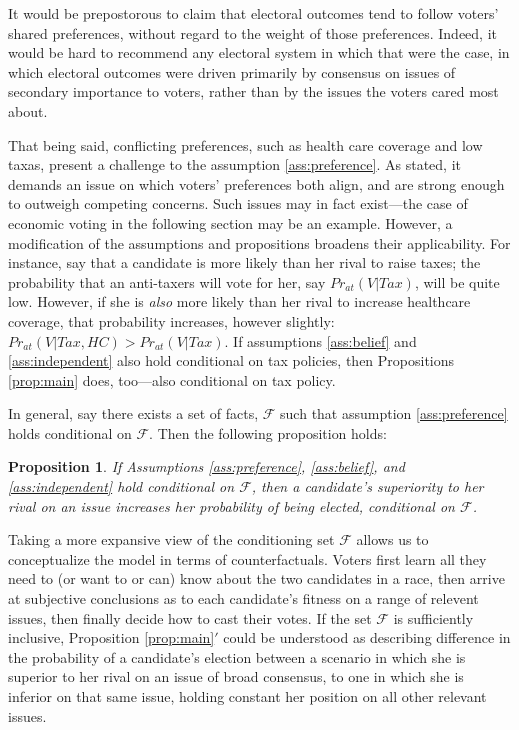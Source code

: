 \documentclass[11pt]{article}
\newtheorem{prop}{Proposition}
\newenvironment{propbis}[1]
  {\renewcommand{\theprop}{\ref{#1}$'$}%
   \addtocounter{prop}{-1}%
   \begin{prop}}
  {\end{prop}}
\begin{document}
It would be prepostorous to claim that electoral outcomes tend
to follow voters' shared preferences, without regard to the weight of
those preferences.
Indeed, it would be hard to recommend any electoral system in which
that were the case, in which electoral outcomes were driven primarily by
consensus on issues of secondary importance to voters, rather than by
the issues the voters cared most about. 

That being said, conflicting preferences, such as health care coverage
and low taxas, present a challenge to the assumption
\ref{ass:preference}.
As stated, it demands an issue on which voters' preferences both
align, and are strong enough to outweigh competing concerns.
Such issues may in fact exist---the case of economic voting in the
following section may be an example.
However, a modification of the assumptions and propositions
broadens their applicability. 
For instance, say that a candidate is more likely than her rival to
raise taxes; the probability that an anti-taxers will vote for her,
say $Pr_{at}(V|Tax)$, will be quite low.
However, if she is \emph{also} more likely than her rival to increase
healthcare coverage, that probability increases, however slightly:
$Pr_{at}(V|Tax,HC)>Pr_{at}(V|Tax)$. 
If assumptions \ref{ass:belief} and \ref{ass:independent} also hold
conditional on tax policies, then Propositions \ref{prop:main} does,
too---also conditional on tax policy.

In general, say there exists a set of facts, $\mathcal{F}$ such that
assumption \ref{ass:preference} holds conditional on $\mathcal{F}$.
Then the following proposition holds:
\begin{propbis}{prop:main}\label{prop:mainPrime}
If Assumptions \ref{ass:preference}, \ref{ass:belief}, and
\ref{ass:independent} hold conditional on $\mathcal{F}$, then
a candidate's superiority to her rival on an issue increases her
probability of being elected, conditional on $\mathcal{F}$.
\end{propbis}

Taking a more expansive view of the conditioning set $\mathcal{F}$
allows us to conceptualize the model in terms of counterfactuals. 
Voters first learn all they need to (or want to or can) know about the two
candidates in a race, then arrive at subjective conclusions as to each
candidate's fitness on a range of relevent issues, then finally decide
how to cast their votes. 
If the set $\mathcal{F}$ is sufficiently inclusive, Proposition
\ref{prop:main}$'$ could be understood as describing difference in the
probability of a candidate's election between a scenario in which she
is superior to her rival on an issue of broad consensus, to one in
which she is inferior on that same issue, holding constant her
position on all other relevant issues. 
\end{document}

